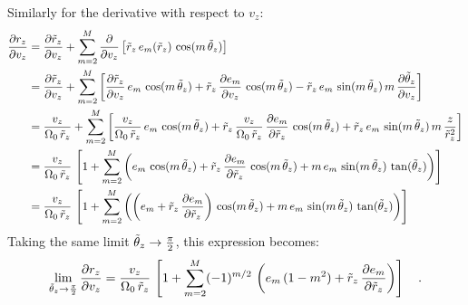 Similarly for the derivative with respect to $v_z$:
\begin{align}
    \frac{\partial r_z}{\partial v_z} &=
        \frac{\partial \tilde{r}_z}{\partial v_z} +
        \sum_{m=2}^{M} \frac{\partial}{\partial v_z}
            \left[\tilde{r}_z \, e_m(\tilde{r}_z) \, \cos(m \, \tilde{\theta}_z)\right]\\
    &= \frac{\partial \tilde{r}_z}{\partial v_z} +
        \sum_{m=2}^{M} \left[
        \frac{\partial \tilde{r}_z}{\partial v_z} \, e_m \, \cos(m \, \tilde{\theta}_z)
        + \tilde{r}_z \, \frac{\partial e_m}{\partial v_z} \, \cos(m \, \tilde{\theta}_z)
        - \tilde{r}_z \, e_m \, \sin(m \, \tilde{\theta}_z) \, m \,\frac{\partial \tilde{\theta}_z}{\partial v_z}\right]\\
    &= \frac{v_z}{\Omega_0\,\tilde{r}_z} + \sum_{m=2}^{M} \left[
        \frac{v_z}{\Omega_0\,\tilde{r}_z} \, e_m \, \cos(m \, \tilde{\theta}_z) +
        \tilde{r}_z \, \frac{v_z}{\Omega_0\,\tilde{r}_z} \, \frac{\partial e_m}{\partial \tilde{r}_z} \, \cos(m \, \tilde{\theta}_z) +
        \tilde{r}_z \, e_m \, \sin(m \, \tilde{\theta}_z) \, m \, \frac{z}{\tilde{r}_z^2}\right]\\
    &= \frac{v_z}{\Omega_0 \, \tilde{r}_z} \, \left[
        1 + \sum_{m=2}^{M} \left(
            e_m \, \cos(m \, \tilde{\theta}_z) +
                \tilde{r}_z \, \frac{\partial e_m}{\partial \tilde{r}_z} \, \cos(m \, \tilde{\theta}_z) +
                m \, e_m \, \sin(m \, \tilde{\theta}_z) \, \tan(\tilde{\theta}_z)
        \right)
    \right]\\
    &= \frac{v_z}{\Omega_0 \, \tilde{r}_z} \, \left[
        1 + \sum_{m=2}^{M} \left(
            \left(e_m + \tilde{r}_z \, \frac{\partial e_m}{\partial \tilde{r}_z}\right) \,
                \cos(m \, \tilde{\theta}_z) +
            m \, e_m \, \sin(m \, \tilde{\theta}_z) \, \tan(\tilde{\theta}_z)
        \right)
    \right]
\end{align}
Taking the same limit $\tilde{\theta}_z \to \frac{\pi}{2}$, this expression becomes:
\begin{equation}
    \lim_{\tilde{\theta}_z \to \frac{\pi}{2}} \frac{\partial r_z}{\partial v_z} =
        \frac{v_z}{\Omega_0 \, \tilde{r}_z} \, \left[
            1 + \sum_{m=2}^{M} (-1)^{m/2} \,
                \left(e_m\,(1 - m^2) + \tilde{r}_z \, \frac{\partial e_m}{\partial \tilde{r}_z}\right)
        \right] \quad .
\end{equation}


